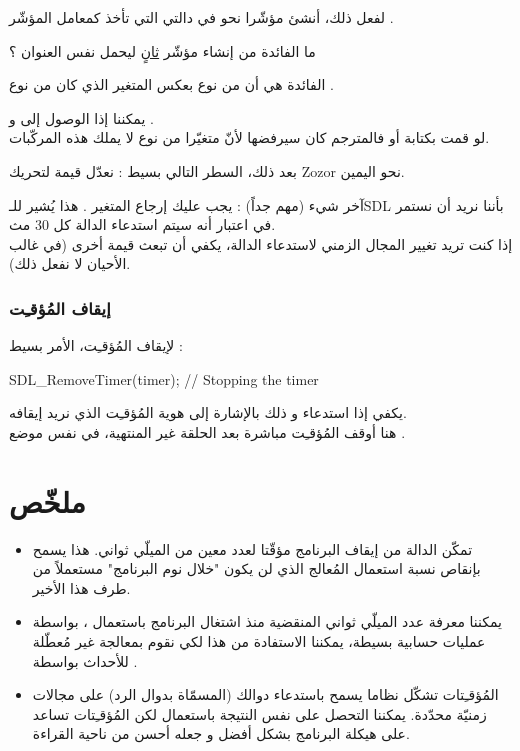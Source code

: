 لفعل ذلك، أنشئ مؤشّرا نحو
في دالتي التي تأخذ كمعامل المؤشّر 
.

\begin{question}
ما الفائدة من إنشاء مؤشّر \underline{ثانٍ} ليحمل نفس العنوان ؟
\end{question}

الفائدة هي أن
من نوع
بعكس المتغير
الذي كان من نوع
.

يمكننا إذا الوصول إلى
و
.\\
لو قمت بكتابة
أو
فالمترجم كان سيرفضها لأنّ متغيّرا من نوع
لا يملك هذه المركّبات.

بعد ذلك، السطر التالي بسيط : نعدّل قيمة
لتحريك
\textenglish{Zozor}
نحو اليمين.

آخر شيء (مهم جداً) : يجب عليك إرجاع المتغير
.
 هذا يُشير للـ\textenglish{SDL}
بأننا نريد أن نستمر في اعتبار أنه سيتم استدعاء الدالة كل 30 مث.\\
إذا كنت تريد تغيير المجال الزمني لاستدعاء الدالة، يكفي أن تبعث قيمة أخرى (في غالب الأحيان لا نفعل ذلك).

\subsubsection{إيقاف  المُؤقـِت}

لإيقاف المُؤقـِت، الأمر بسيط :

\begin{Csource}
SDL_RemoveTimer(timer); // Stopping the timer
\end{Csource}

 يكفي إذا استدعاء
و ذلك بالإشارة إلى هوية المُؤقـِت الذي نريد إيقافه.\\
هنا أوقف المُؤقـِت مباشرة بعد الحلقة غير المنتهية، في نفس موضع
.

\section*{ملخّص}

\begin{itemize}
	\item تمكّن الدالة 
	من إيقاف البرنامج مؤقّتا لعدد معين من الميلّي ثواني. هذا يسمح بإنقاص نسبة استعمال المُعالج الذي لن يكون "خلال نوم البرنامج" مستعملاً من طرف هذا الأخير.
	\item يمكننا معرفة عدد الميلّي ثواني المنقضية منذ اشتغال البرنامج باستعمال 
	،
	بواسطة عمليات حسابية بسيطة، يمكننا الاستفادة من هذا لكي نقوم بمعالجة غير مُعطّلة للأحداث بواسطة
	.
	\item المُؤقـِتات تشكّل نظاما يسمح باستدعاء دوالك (المسمّاة بدوال الرد) على مجالات زمنيّة محدّدة. يمكننا التحصل على نفس النتيجة باستعمال
	لكن المُؤقـِتات تساعد على هيكلة البرنامج بشكل أفضل و جعله أحسن من ناحية القراءة.
\end{itemize}
